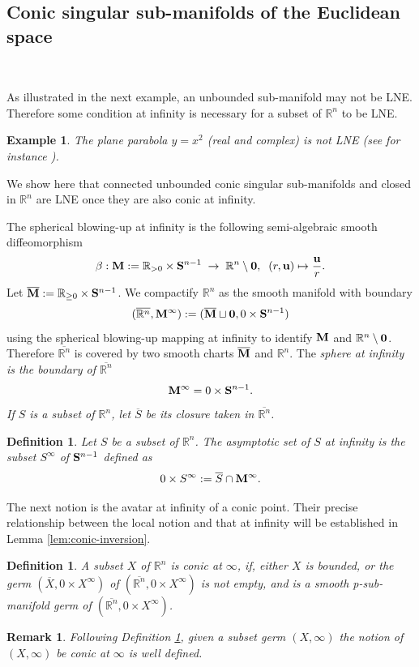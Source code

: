 \documentclass[11pt]{amsart}
\newtheorem{definition}[theorem]{Definition}
\newtheorem{example}[theorem]{Example}
\newtheorem{remark}[theorem]{Remark}
\newcommand{\field}[1]{\mathbb{#1}}
\newcommand{\R}{\field{R}}
\newcommand{\bbo}{{\bf 0}}
\newcommand{\bB}{{\bf B}}
\newcommand{\bM}{{\bf M}}
\newcommand{\bMbar}{\overline{\bf M}}
\newcommand{\bS}{{\bf S}}
\newcommand{\bu}{{\bf u}}
\newcommand{\dd}{{\partial}}
\newcommand{\ovS}{{\overline{S}}}
\newcommand{\ovX}{{\overline{X}}}
\newcommand{\Rgo}{{\R_{\geq 0}}}
\newcommand{\Rn}{{\R^n}}
\newcommand{\Rnbar}{\overline{\R^n}}
\numberwithin{equation}{section}
\numberwithin{equation}{section}
\begin{document}
	
	\subsection{Conic singular sub-manifolds of the Euclidean space}\label{section:CL}
$ $

As illustrated in the next example, an unbounded sub-manifold 
may not be LNE. Therefore some condition at infinity is necessary for a subset of 
$\Rn$ to be 
LNE. 
%
%
	\begin{example}\label{exparabola}
		The plane parabola $y=x^2$ (real and complex) is not LNE (see for instance \cite{FeSa,Cos,CoGrMi1}).
	\end{example}
%
%
\noindent
 We show here that connected unbounded conic singular sub-manifolds and closed in $\Rn$ are LNE once they are also conic at infinity.
	
\bigskip
	The spherical blowing-up at infinity is the following semi-algebraic 
	smooth diffeomorphism 
	$$
	\beta : \bM := \R_{>0}\times\bS^{n-1}\;  \to \; \Rn\setminus \bbo, \;\;
	(r,\bu) \mapsto \frac{\bu}{r}. 
	$$
    Let $\bMbar := \Rgo\times \bS^{n-1}$.
	We compactify $\Rn$ as the smooth manifold with boundary
	$$
	(\Rnbar,\bM^\infty) := (\bMbar \sqcup \bbo,0\times\bS^{n-1})
	$$
	using the spherical blowing-up mapping at infinity to identify $\bM$ and 
	$\Rn\setminus\bbo$. Therefore $\Rnbar$ is covered by two smooth charts 
	$\bMbar$ and $\Rn$. The \em sphere at infinity \em is the boundary of 
	$\Rnbar$ 
	$$
	\bM^\infty = 0\times \bS^{n-1}.
	$$
	If $S$ is a subset of $\Rn$, let $\ovS$ be its closure taken in $\Rnbar$.
	\begin{definition}\label{def:asymptotic-set}
		Let $S$ be a subset of $\Rn$. The \em asymptotic set of $S$ at infinity \em
		is the subset $S^\infty$ of $\bS^{n-1}$ defined as 
		$$
		0\times S^\infty := \ovS \cap \bM^\infty.
		$$ 
	\end{definition}
	
	The next notion is the avatar at infinity of a conic point. Their precise 
	relationship between the local notion and that at infinity will 
	be established in Lemma \ref{lem:conic-inversion}.
	\begin{definition}\label{def:conic-infty}
		A subset $X$ of $\Rn$ is \em conic at $\infty$, \em 
		if, either $X$ is bounded,  or the germ $(\ovX,0\times X^\infty)$ of 
		$(\Rnbar,0\times X^\infty)$ is not empty, and is a  smooth p-sub-manifold 
		germ of $(\Rnbar,0\times X^\infty)$.
	\end{definition}
	\begin{remark}\label{rmk:germ-conic-infty}
		Following Definition \ref{def:conic-infty}, given a subset germ $(X,\infty)$ 
		the notion of $(X,\infty)$ be conic at $\infty$ is well defined.  
	\end{remark}
	
\end{document}
